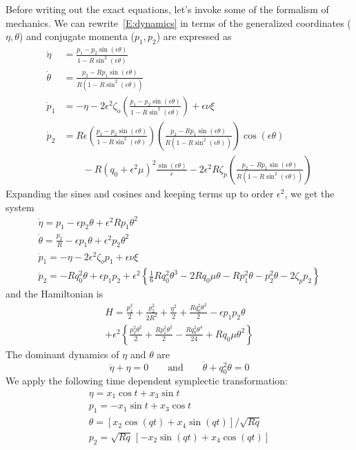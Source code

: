 Before writing out the exact equations, let's invoke some of the formalism of mechanics. We can rewrite~\eqref{E:dynamics} in terms of the generalized coordinates ($\eta, \theta$) and conjugate momenta ($p_1, p_2$) are expressed as
\[
\begin{aligned}
\dot \eta &= \frac{p_1 - p_2\sin (\epsilon \theta)}{1-R\sin^2(\epsilon \theta)}\\
\dot \theta &= \frac{p_2 - Rp_1\sin (\epsilon \theta)}{R(1-R\sin^2(\epsilon \theta))} \\
\dot p_1 &= -\eta - 2 \epsilon^2 \zeta_o\left(\frac{p_1 - p_2\sin (\epsilon \theta)}{1-R\sin^2(\epsilon \theta)}\right) + \epsilon \nu \xi\\
\dot p_2 &= R\epsilon \left(\frac{p_1 - p_2\sin (\epsilon \theta)}{1-R\sin^2(\epsilon \theta)}\right)\left(\frac{p_2 - Rp_1\sin (\epsilon \theta)}{R(1-R\sin^2(\epsilon \theta))}\right)\cos(\epsilon \theta) \\
&\qquad - R (q_0 + \epsilon^2 \mu)^2\frac{\sin (\epsilon \theta)}{\epsilon} - 2 \epsilon^2 R \zeta_p \left(\frac{p_2 - Rp_1\sin (\epsilon \theta)}{R(1-R\sin^2(\epsilon \theta))}\right)
\end{aligned}
\]
Expanding the sines and cosines and keeping terms up to order $\epsilon^2$, we get the system
\begin{gather*}
\dot \eta = p_1 - \epsilon p_2 \theta + \epsilon^2 R p_1 \theta^2\\
\dot \theta = \frac{p_2}{R} - \epsilon p_1 \theta + \epsilon^2 p_2 \theta^2\\
\dot p_1 = -\eta - 2 \epsilon^2 \zeta_o p_1 + \epsilon \nu \xi\\
\dot p_2 = -R q_0^2 \theta + \epsilon p_1 p_2 + \epsilon^2 \left\{\frac{1}{6} R q_0^2 \theta^3 - 2 R q_0 \mu \theta - R p_1^2 \theta - p_2^2 \theta - 2 \zeta_p p_2\right\}
\end{gather*}
and the Hamiltonian is
\begin{multline*}
\label{e:hamiltonian}
H = \frac{p_1^2}{2} + \frac{p_2^2}{2R^2} + \frac{\eta^2}{2} + \frac{Rq_0^2\theta^2}{2} - \epsilon p_1 p_2 \theta\\ + \epsilon^2\left\{\frac{p_2^2 \theta^2}{2} + \frac{R p_1^2\theta^2}{2} - \frac{R q_0^2 \theta^4}{24} + R q_0 \mu \theta^2 \right\}
\end{multline*}
The dominant dynamics of $\eta$ and $\theta$ are
\[
\ddot \eta + \eta = 0 \qquad \text{and}\qquad \ddot \theta + q_0^2 \theta = 0
\]
We apply the following time dependent symplectic transformation:
\begin{gather*}
\eta = x_1 \cos t + x_3 \sin t\\
p_1 = -x_1 \sin t + x_3 \cos t \\
\theta = [x_2 \cos (q t) + x_4 \sin (q t)]/\sqrt{R q}\\
p_2 = \sqrt{R q}\, [-x_2 \sin (q t) + x_4 \cos (q t)]
\end{gather*}
